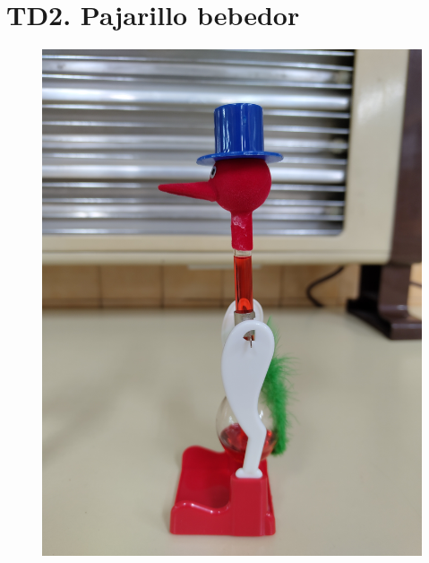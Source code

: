 \documentclass[12pt,letterpaper,oneside,openany,spanish]{book}
\begin{document}
\chapter[TD2. Pajarillo bebedor]{TD2. Pajarillo bebedor}
\thispagestyle{empty}
\vspace{1cm}
\begin{figure}[h]
    \centering
    \hspace*{-0.2cm}
    \includegraphics[width=.8\textwidth,angle=270]{Fotos/Pajarillo/Portada.jpg}
    \hspace*{-0.4cm}
    \end{figure}                                      

\end{document}
